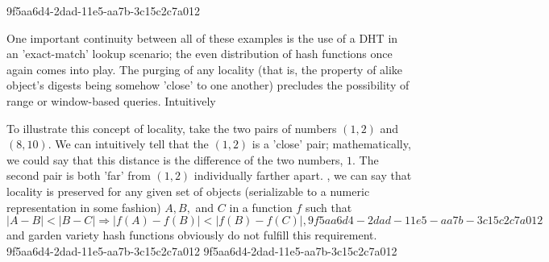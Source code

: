 \documentclass[12pt]{article}
\begin{document}
9f5aa6d4-2dad-11e5-aa7b-3c15c2c7a012\par One important continuity between all of these examples is the use of a DHT in an 'exact-match' lookup scenario; the even distribution of hash functions once again comes into play. The purging of any locality (that is, the property of alike object's digests being somehow 'close' to one another) precludes the possibility of range or window-based queries. Intuitively

\par To illustrate this concept of locality, take the two pairs of numbers $(1,2)$ and $(8,10)$. We can intuitively tell that the $(1,2)$ is a 'close' pair; mathematically, we could say that this distance is the difference of the two numbers, $1$. The second pair is both 'far' from $(1,2)$ individually farther apart. , we can say that locality is preserved for any given set of objects (serializable to a numeric representation in some fashion) $A,B,$ and $C$ in a function $f$ such that
\begin{equation}
|A-B| < |B-C| \Rightarrow |f(A)-f(B)| < |f(B) - f(C)|,
9f5aa6d4-2dad-11e5-aa7b-3c15c2c7a012\end{equation}
and garden variety hash functions obviously do not fulfill this requirement.
9f5aa6d4-2dad-11e5-aa7b-3c15c2c7a012
\printbibliography
9f5aa6d4-2dad-11e5-aa7b-3c15c2c7a012
\end{document}
